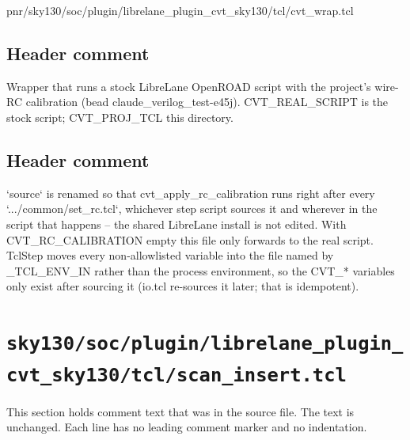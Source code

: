 \begin{relocated}{pnr/sky130/soc/plugin/librelane_plugin_cvt_sky130/tcl/cvt_wrap.tcl}

\subsection*{Header comment}

\begin{textblock}
Wrapper that runs a stock LibreLane OpenROAD script with the project's wire-RC calibration
(bead claude_verilog_test-e45j). CVT_REAL_SCRIPT is the stock script; CVT_PROJ_TCL this directory.
\end{textblock}

\subsection*{Header comment}

\begin{textblock}
`source` is renamed so that cvt_apply_rc_calibration runs right after every
`.../common/set_rc.tcl`, whichever step script sources it and wherever in the script that
happens -- the shared LibreLane install is not edited. With CVT_RC_CALIBRATION empty this file
only forwards to the real script.
TclStep moves every non-allowlisted variable into the file named by _TCL_ENV_IN rather than the
process environment, so the CVT_* variables only exist after sourcing it (io.tcl re-sources it
later; that is idempotent).
\end{textblock}

\end{relocated}

\section{\texttt{sky130/soc/plugin/librelane\_plugin\_cvt\_sky130/tcl/scan\_insert.tcl}}\label{tm:pd:sky130-soc-plugin-librelane-cvt-tcl-scan-insert}

This section holds comment text that was in the source file. The text is unchanged. Each line has no leading comment marker and no indentation.

